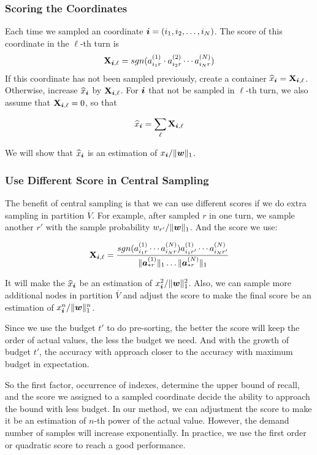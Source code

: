 \documentclass[letterpaper]{article}
\newcommand{\Sca}[3]{{#1}^{(#2)}_{i_#2#3}}%
\newcommand{\V}[1]{{\bm{{\MakeLowercase{#1}}}}}
\newcommand{\Vacol}[1]{\V{a}^{(#1)}_{*r}}
\newcommand{\M}[1]{{\bm{\mathbf{\MakeUppercase{#1}}}}}
\newcommand{\norm}[2]{\|#1\|_{#2}}
\newcommand{\Coord}{(i_1,i_2,\ldots,i_N)}
\begin{document}
\subsubsection{Scoring the Coordinates}

Each time we sampled an coordinate $\V{i} = \Coord $. The score of this coordinate in the $\ell $-th turn is 
\[
\M{X}_{\V{i},\ell}  = sgn(\Sca{a}{1}{r}\cdot\Sca{a}{2}{r}\cdots\Sca{a}{N}{r})
\]
If this coordinate has not been sampled previously, create a container $\widehat{x}_{\V{i}} = \M{X}_{\V{i},\ell}$. Otherwise, increase $\widehat{x}_{\V{i}}$ by $\M{X}_{\V{i},\ell}$. For $\V{i}$ that not be sampled in $\ell$-th turn, we also assume that $\M{X}_{\V{i},\ell}=0$, so that

\[
\widehat{x}_{\V{i}} = \sum_{\ell} \M{X}_{\V{i},\ell}
\]

We will show that $\widehat{x}_{\V{i}}$ is an estimation of $x_{\V{i}}/\norm{\V{w}}{1}$.

\subsubsection{Use Different Score in Central Sampling}
The benefit of central sampling is that we can use different scores if we do extra sampling in partition $\overline{V}$. For example, after sampled $r$ in one turn, we sample another $r'$ with the sample probability $w_{r'}/\norm{\V{w}}{1}$. And the score we use:

\[
\M{X}_{\V{i},\ell}  = \frac{sgn(\Sca{a}{1}{r}\cdots\Sca{a}{N}{r})\Sca{a}{1}{r'}\cdots\Sca{a}{N}{r'}}{\norm{\Vacol{1}}{1}\ldots\norm{\Vacol{N}}{1}}
\]

It will make the $\widehat{x}_{\V{i}}$ be an estimation of $x_{\V{i}}^2/\norm{\V{w}}{1}^2$. Also, we can sample more additional nodes in partition $\overline{V}$ and adjust the score to make the final score be an estimation of $x_{\V{i}}^n/\norm{\V{w}}{1}^n$. 

Since we use the budget $t'$ to do pre-sorting, the better the score will keep the order of actual values, the less the budget we need. And with the growth of budget $t'$, the accuracy with approach closer to the accuracy with maximum budget in expectation. 

So the first factor, occurrence of indexes, determine the upper bound of recall, and the score we assigned to a sampled coordinate decide the ability to approach the bound with less budget. In our method, we can adjustment the score to make it be an estimation of $n$-th power of the actual value. However, the demand number of samples will increase exponentially. In practice, we use the first order or quadratic score to reach a good performance.
\end{document}
